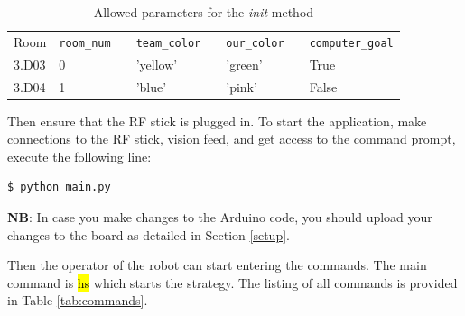 \documentclass[a4paper,12pt]{article}
\newcommand{\hg}[1]{\hl{\ttfamily #1}}
\begin{document}
\begin{table}[h!]
\centering
\begin{tabular}{ | l | l | l | l | l | l | l | l | }
    \cline{1-2} \cline{4-4} \cline{6-6} \cline{8-8}
    Room & \texttt{room\_num} & & \texttt{team\_color} & & \texttt{our\_color} & & \texttt{computer\_goal} \\ 
    \cline{1-2} \cline{4-4} \cline{6-6} \cline{8-8}
    3.D03 & 0 & & 'yellow' & & 'green' & & True \\ 
    \cline{1-2} \cline{4-4} \cline{6-6} \cline{8-8}
    3.D04 & 1 & & 'blue' & & 'pink' & & False \\ 
    \cline{1-2} \cline{4-4} \cline{6-6} \cline{8-8}
\end{tabular}
\caption{Allowed parameters for the \textit{init} method}
\label{tab:params}
\end{table}

Then ensure that the RF stick is plugged in. To start the application, make connections to the RF stick, vision feed, and get access to the command prompt, execute the following line:
\begin{lstlisting}
$ python main.py
\end{lstlisting}

\textbf{NB}: In case you make changes to the Arduino code, you should upload your changes to the board as detailed in Section \ref{setup}.

Then the operator of the robot can start entering the commands. The main command is \hg{hs} which starts the strategy. The listing of all commands is provided in Table \ref{tab:commands}.
\end{document}
